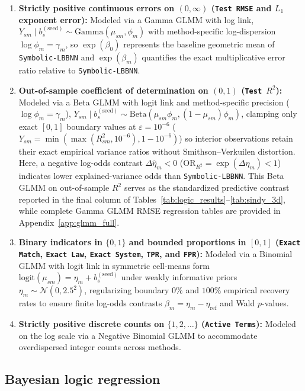 \documentclass[11pt,a4paper]{article}
\begin{document}
\begin{enumerate}
  \item \textbf{Strictly positive continuous errors on $(0, \infty)$ (\texttt{Test RMSE} and $L_1$ exponent error):} Modeled via a Gamma GLMM with log link, $Y_{sm} \mid b_s^{(\text{seed})} \sim \mathrm{Gamma}(\mu_{sm}, \phi_m)$ with method-specific log-dispersion $\log \phi_m = \gamma_m$, so $\exp(\beta_0)$ represents the baseline geometric mean of \texttt{Symbolic-LBBNN} and $\exp(\beta_m)$ quantifies the exact multiplicative error ratio relative to \texttt{Symbolic-LBBNN}.
  \item \textbf{Out-of-sample coefficient of determination on $(0, 1)$ (\texttt{Test $R^2$}):} Modeled via a Beta GLMM with logit link and method-specific precision ($\log \phi_m = \gamma_m$), $Y_{sm} \mid b_s^{(\text{seed})} \sim \mathrm{Beta}(\mu_{sm}\phi_m, (1 - \mu_{sm})\phi_m)$, clamping only exact $[0, 1]$ boundary values at $\varepsilon = 10^{-6}$ ($Y_{sm} = \min(\max(R_{sm}^2, 10^{-6}), 1 - 10^{-6})$) so interior observations retain their exact empirical variance ratios without Smithson--Verkuilen distortion. Here, a negative log-odds contrast $\Delta\hat{\eta}_m < 0$ ($\mathrm{OR}_{R^2} = \exp(\Delta\hat{\eta}_m) < 1$) indicates lower explained-variance odds than \texttt{Symbolic-LBBNN}. This Beta GLMM on out-of-sample $R^2$ serves as the standardized predictive contrast reported in the final column of Tables~\ref{tab:logic_results}--\ref{tab:sindy_3d}, while complete Gamma GLMM RMSE regression tables are provided in Appendix~\ref{app:glmm_full}.
  \item \textbf{Binary indicators in $\{0, 1\}$ and bounded proportions in $[0, 1]$ (\texttt{Exact Match}, \texttt{Exact Law}, \texttt{Exact System}, \texttt{TPR}, and \texttt{FPR}):} Modeled via a Binomial GLMM with logit link in symmetric cell-means form $\mathrm{logit}(\mu_{sm}) = \eta_m + b_s^{(\text{seed})}$ under weakly informative priors $\eta_m \sim \mathcal{N}(0, 2.5^2)$, regularizing boundary $0\%$ and $100\%$ empirical recovery rates to ensure finite log-odds contrasts $\beta_m = \eta_m - \eta_{\text{ref}}$ and Wald $p$-values.
  \item \textbf{Strictly positive discrete counts on $\{1, 2, \dots\}$ (\texttt{Active Terms}):} Modeled on the log scale via a Negative Binomial GLMM to accommodate overdispersed integer counts across methods.
\end{enumerate}

\subsection{Bayesian logic regression}
\label{sec:exp:logic}
\end{document}
